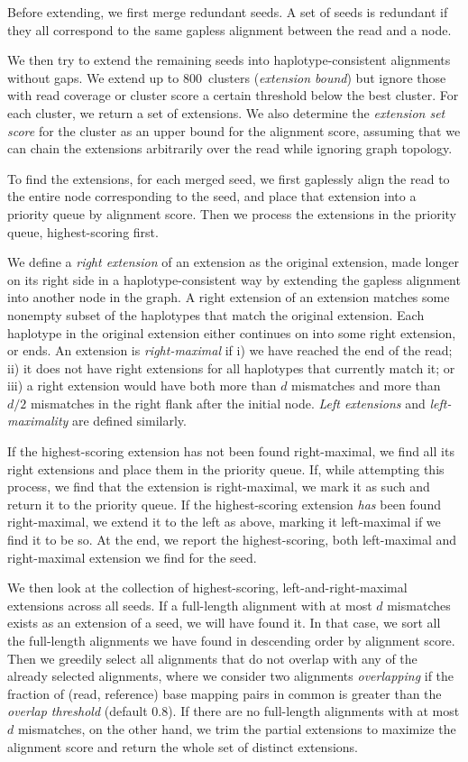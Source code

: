 \documentclass[11pt]{ucscthesis}
\newcommand{\param}[1]{\emph{#1}}
\newcommand{\vocab}[1]{\emph{#1}}
\begin{document}
Before extending, we first merge redundant seeds.
A set of seeds is redundant if they all correspond to the same gapless alignment between the read and a node.

We then try to extend the remaining seeds into haplotype-consistent alignments without gaps.
We extend up to 800~clusters (\param{extension bound}) but ignore those with read coverage or cluster score a certain threshold below the best cluster.
For each cluster, we return a set of extensions.
We also determine the \vocab{extension set score} for the cluster as an upper bound for the alignment score, assuming that we can chain the extensions arbitrarily over the read while ignoring graph topology.

To find the extensions, for each merged seed, we first gaplessly align the read to the entire node corresponding to the seed, and place that extension into a priority queue by alignment score.
Then we process the extensions in the priority queue, highest-scoring first.

We define a \vocab{right extension} of an extension as the original extension, made longer on its right side in a haplotype-consistent way by extending the gapless alignment into another node in the graph.
A right extension of an extension matches some nonempty subset of the haplotypes that match the original extension.
Each haplotype in the original extension either continues on into some right extension, or ends.
An extension is \vocab{right-maximal} if i) we have reached the end of the read; ii) it does not have right extensions for all haplotypes that currently match it; or iii) a right extension would have both more than $d$ mismatches and more than $d/2$ mismatches in the right flank after the initial node.
\vocab{Left extensions} and \vocab{left-maximality} are defined similarly.

If the highest-scoring extension has not been found right-maximal, we find all its right extensions and place them in the priority queue.
If, while attempting this process, we find that the extension is right-maximal, we mark it as such and return it to the priority queue.
If the highest-scoring extension \emph{has} been found right-maximal, we extend it to the left as above, marking it left-maximal if we find it to be so.
At the end, we report the highest-scoring, both left-maximal and right-maximal extension we find for the seed.

We then look at the collection of highest-scoring, left-and-right-maximal extensions across all seeds.
If a full-length alignment with at most $d$ mismatches exists as an extension of a seed, we will have found it.
In that case, we sort all the full-length alignments we have found in descending order by alignment score.
Then we greedily select all alignments that do not overlap with any of the already selected alignments, where we consider two alignments \vocab{overlapping} if the fraction of (read, reference) base mapping pairs in common is greater than the \param{overlap threshold} (default 0.8).
If there are no full-length alignments with at most $d$ mismatches, on the other hand, we trim the partial extensions to maximize the alignment score and return the whole set of distinct extensions.
\end{document}
